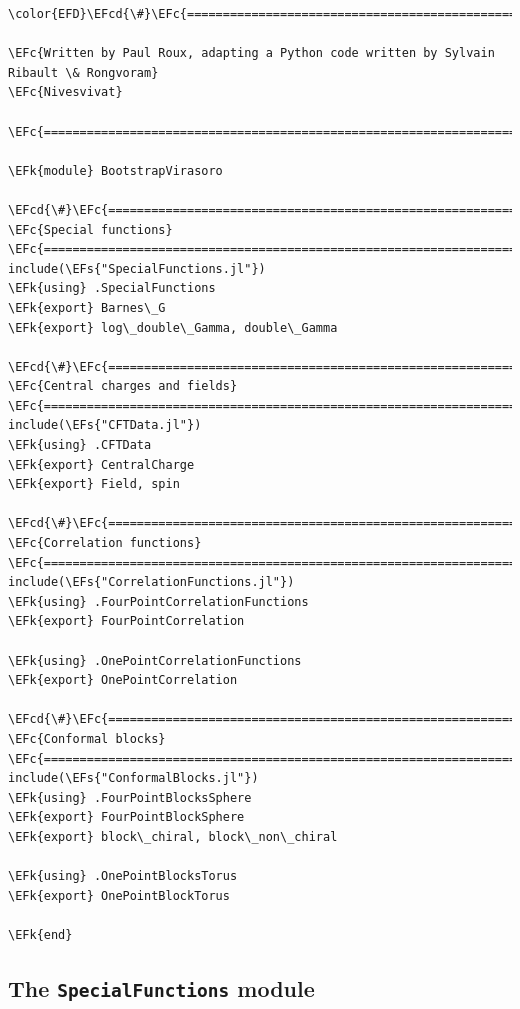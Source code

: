 \documentclass[a4paper]{article}
\numberwithin{equation}{section}
\newcommand{\EFc}[1]{\textcolor{EFc}{#1}} %
\newcommand{\EFcd}[1]{\textcolor{EFcd}{#1}} %
\newcommand{\EFs}[1]{\textcolor{EFs}{#1}} %
\newcommand{\EFk}[1]{\textcolor{EFk}{#1}} %
\begin{document}
\begin{Code}
\begin{Verbatim}
\color{EFD}\EFcd{\#}\EFc{===========================================================================================}

\EFc{Written by Paul Roux, adapting a Python code written by Sylvain Ribault \& Rongvoram}
\EFc{Nivesvivat}

\EFc{===========================================================================================\#}

\EFk{module} BootstrapVirasoro

\EFcd{\#}\EFc{===========================================================================================}
\EFc{Special functions}
\EFc{===========================================================================================\#}
include(\EFs{"SpecialFunctions.jl"})
\EFk{using} .SpecialFunctions
\EFk{export} Barnes\_G
\EFk{export} log\_double\_Gamma, double\_Gamma

\EFcd{\#}\EFc{===========================================================================================}
\EFc{Central charges and fields}
\EFc{===========================================================================================\#}
include(\EFs{"CFTData.jl"})
\EFk{using} .CFTData
\EFk{export} CentralCharge
\EFk{export} Field, spin

\EFcd{\#}\EFc{===========================================================================================}
\EFc{Correlation functions}
\EFc{===========================================================================================\#}
include(\EFs{"CorrelationFunctions.jl"})
\EFk{using} .FourPointCorrelationFunctions
\EFk{export} FourPointCorrelation

\EFk{using} .OnePointCorrelationFunctions
\EFk{export} OnePointCorrelation

\EFcd{\#}\EFc{===========================================================================================}
\EFc{Conformal blocks}
\EFc{===========================================================================================\#}
include(\EFs{"ConformalBlocks.jl"})
\EFk{using} .FourPointBlocksSphere
\EFk{export} FourPointBlockSphere
\EFk{export} block\_chiral, block\_non\_chiral

\EFk{using} .OnePointBlocksTorus
\EFk{export} OnePointBlockTorus

\EFk{end}
\end{Verbatim}
\end{Code}
\subsection{The \texttt{SpecialFunctions} module}
\label{sec:org114e461}
\end{document}
